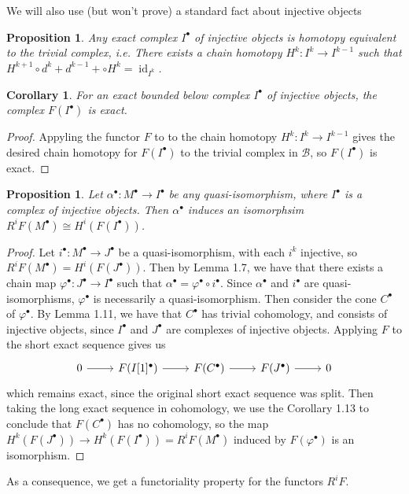 \documentclass[psamsfonts, 12pt]{amsart}
\newtheorem{cor}[thm]{Corollary}
\newtheorem{prop}[thm]{Proposition}
\theoremstyle{definition}
\theoremstyle{remark}
\DeclareMathOperator{\id}{id}
\begin{document}
%
We will also use (but won't prove) a standard fact about injective objects
%
\begin{prop}
Any exact complex $I^\bullet$ of injective objects is homotopy equivalent to the
trivial complex, i.e. There exists a chain homotopy $H^k : I^k \to I^{k-1}$ such that
$H^{k+1} \circ d^k + d^{k-1}+ \circ H^k = \id_{I^k}$.
\end{prop}
%
\begin{cor}
For an exact bounded below complex $I^\bullet$ of injective objects,
the complex $F(I^\bullet)$ is exact.
\end{cor}
%
\begin{proof}
Appyling the functor $F$ to to the chain homotopy $H^k : I^k \to I^{k-1}$
gives the desired chain homotopy for $F(I^\bullet)$ to the trivial complex in
$\mathcal{B}$, so $F(I^\bullet)$ is exact.
\end{proof}
%
\begin{prop}
Let $\alpha^\bullet : M^\bullet \to I^\bullet$ be any quasi-isomorphism, where
$I^\bullet$ is a complex of injective objects. Then $\alpha^\bullet$ induces
an isomorphsim  $R^iF(M^\bullet) \cong H^i(F(I^\bullet))$.
\end{prop}
%
\begin{proof}
Let $i^\bullet : M^\bullet \to J^\bullet$ be a quasi-isomorphism, with
each $i^k$ injective, so $R^iF(M^\bullet) = H^i(F(J^\bullet))$. Then by
Lemma 1.7, we have that there exists a chain map
$\varphi^\bullet : J^\bullet \to I^\bullet$ such that
$\alpha^\bullet = \varphi^\bullet \circ i^\bullet$. Since $\alpha^\bullet$ and
$i^\bullet$ are quasi-isomorphisms, $\varphi^\bullet$ is necessarily a
quasi-isomorphism. Then consider the cone $C^\bullet$ of $\varphi^\bullet$.
By Lemma 1.11, we have that $C^\bullet$ has trivial cohomology, and
consists of injective objects, since $I^\bullet$ and $J^\bullet$ are complexes
of injective objects. Applying $F$ to the short exact sequence gives us
\[\begin{tikzcd}
0 \ar[r] & F(I[1]^\bullet) \ar[r] & F(C^\bullet) \ar[r] & F(J^\bullet) \ar[r] & 0
\end{tikzcd}\]
which remains exact, since the original short exact sequence was split. Then
taking the long exact sequence in cohomology, we use the Corollary 1.13 to
conclude that $F(C^\bullet)$ has no cohomology, so the map
$H^k(F(J^\bullet)) \to H^k(F(I^\bullet)) = R^iF(M^\bullet)$ induced by
$F(\varphi^\bullet)$ is an isomorphism.
\end{proof}
%
As a consequence, we get a functoriality property for the functors $R^iF$.
\end{document}
